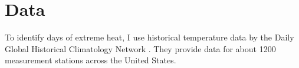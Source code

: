 
\section{Data}

To identify days of extreme heat, I use historical temperature data by the Daily Global Historical Climatology Network \citep{Menne_2012}. They provide data for about 1200 measurement stations across the United States. 